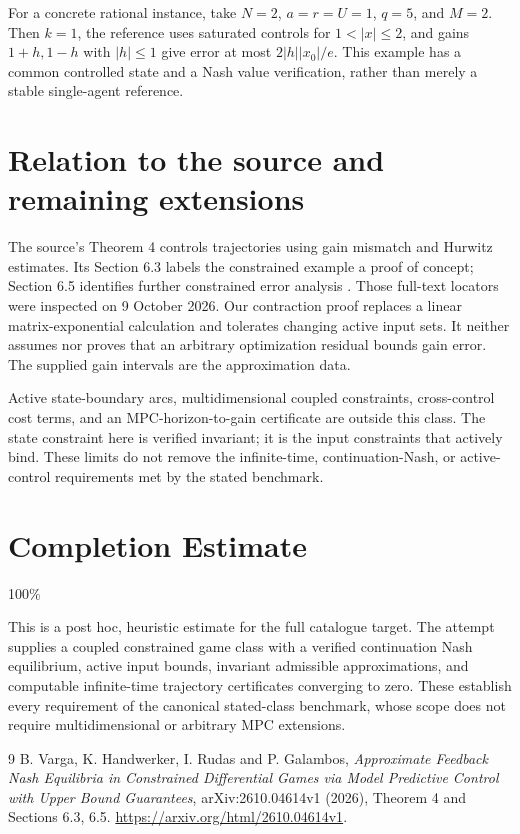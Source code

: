 \documentclass[11pt]{article}
\theoremstyle{remark}
\begin{document}
For a concrete rational instance, take $N=2$, $a=r=U=1$, $q=5$, and $M=2$. Then $k=1$, the reference uses saturated controls for $1<|x|\leq2$, and gains $1+h,1-h$ with $|h|\leq1$ give error at most $2|h||x_0|/e$. This example has a common controlled state and a Nash value verification, rather than merely a stable single-agent reference.

\section{Relation to the source and remaining extensions}
The source's Theorem 4 controls trajectories using gain mismatch and Hurwitz estimates. Its Section 6.3 labels the constrained example a proof of concept; Section 6.5 identifies further constrained error analysis \cite{varga}. Those full-text locators were inspected on 9 October 2026. Our contraction proof replaces a linear matrix-exponential calculation and tolerates changing active input sets. It neither assumes nor proves that an arbitrary optimization residual bounds gain error. The supplied gain intervals are the approximation data.

Active state-boundary arcs, multidimensional coupled constraints, cross-control cost terms, and an MPC-horizon-to-gain certificate are outside this class. The state constraint here is verified invariant; it is the input constraints that actively bind. These limits do not remove the infinite-time, continuation-Nash, or active-control requirements met by the stated benchmark.

\section{Completion Estimate}
100\%

This is a post hoc, heuristic estimate for the full catalogue target.
The attempt supplies a coupled constrained game class with a verified continuation Nash equilibrium, active input bounds, invariant admissible approximations, and computable infinite-time trajectory certificates converging to zero. These establish every requirement of the canonical stated-class benchmark, whose scope does not require multidimensional or arbitrary MPC extensions.

\begin{thebibliography}{9}
 B. Varga, K. Handwerker, I. Rudas and P. Galambos, \emph{Approximate Feedback Nash Equilibria in Constrained Differential Games via Model Predictive Control with Upper Bound Guarantees}, arXiv:2610.04614v1 (2026), Theorem 4 and Sections 6.3, 6.5. \url{https://arxiv.org/html/2610.04614v1}.
\end{thebibliography}
\end{document}
